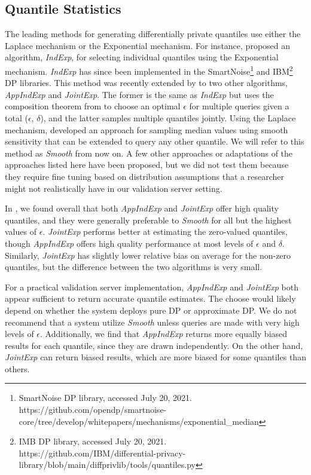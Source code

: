 \subsection{Quantile Statistics}
The leading methods for generating differentially private quantiles use either the Laplace mechanism or the Exponential mechanism. For instance, \citet{smith2011privacy} proposed an algorithm, \textit{IndExp}, for selecting individual quantiles using the Exponential mechanism. \textit{IndExp} has since been implemented in the SmartNoise\footnote{SmartNoise DP library, accessed July 20, 2021. https://github.com/opendp/smartnoise-core/tree/develop/whitepapers/mechanisms/exponential\_median} and IBM\footnote{IMB DP library, accessed July 20, 2021. https://github.com/IBM/differential-privacy-library/blob/main/diffprivlib/tools/quantiles.py} DP libraries. This method was recently extended by \citet{gillenwater2021differentially} to two other algorithms, \textit{AppIndExp} and \textit{JointExp}. The former is the same as \textit{IndExp} but uses the composition theorem from \citet{dong2020optimal} to choose an optimal $\epsilon$ for multiple queries given a total ($\epsilon$, $\delta$), and the latter samples multiple quantiles jointly. Using the Laplace mechanism, \citet{nissim2007smooth} developed an approach for sampling median values using smooth sensitivity that can be extended to query any other quantile. We will refer to this method as \textit{Smooth} from now on. A few other approaches or adaptations of the approaches listed here have been proposed, but we did not test them because they require fine tuning based on distribution assumptions that a researcher might not realistically have in our validation server setting.

In \citet{barrientos2021}, we found overall that both \textit{AppIndExp} and \textit{JointExp} offer high quality quantiles, and they were generally preferable to \textit{Smooth} for all but the highest values of $\epsilon$. \textit{JointExp} performs better at estimating the zero-valued quantiles, though \textit{AppIndExp} offers high quality performance at most levels of $\epsilon$ and $\delta$. Similarly, \textit{JointExp} has slightly lower relative bias on average for the non-zero quantiles, but the difference between the two algorithms is very small. 

For a practical validation server implementation, \textit{AppIndExp} and \textit{JointExp} both appear sufficient to return accurate quantile estimates. The choose would likely depend on whether the system deploys pure DP or approximate DP. We do not recommend that a system utilize \textit{Smooth} unless queries are made with very high levels of $\epsilon$. Additionally, we find that \textit{AppIndExp} returns more equally biased results for each quantile, since they are drawn independently. On the other hand, \textit{JointExp} can return biased results, which are more biased for some quantiles than others.


